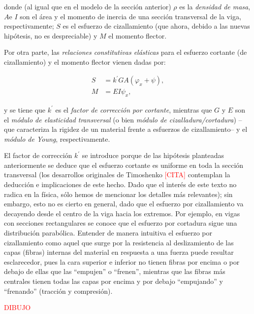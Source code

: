 donde (al igual que en el modelo de la sección anterior) $\rho$ es la \textit{densidad de masa}, $A$\footnotemark e $I$ son el área y el momento de inercia de una sección transversal de la viga, respectivamente; $S$ es el esfuerzo de cizallamiento (que ahora, debido a las nuevas hipótesis, no es despreciable) y $M$ el momento flector.  


Por otra parte, las \textit{relaciones constitutivas elásticas} para el esfuerzo cortante (de cizallamiento) y el momento flector vienen dadas por:

\begin{align}
    S &= k^{\prime}GA(\varphi_x + \psi), \label{timoshenkoBasico:relConstitutivasCortante}\\
    M &= EI \psi_x, \label{timoshenkoBasico:relConstitutivasFlector}
\end{align}

y se tiene que $k^{\prime}$ es el \textit{factor de corrección por cortante}, mientras que $G$ y $E$ son el \textit{módulo de elasticidad transversal} (o bien \textit{módulo de cizalladura/cortadura}) --que caracteriza la rigidez de un material frente a esfuerzos de cizallamiento-- y el \textit{módulo de Young}, respectivamente. 

El factor de corrección $k^{\prime}$ se introduce porque de las hipótesis planteadas anteriormente se deduce que el esfuerzo cortante es uniforme en toda la sección transversal (los desarrollos originales de Timoshenko \textcolor{red}{[CITA]} contemplan la deducción e implicaciones de este hecho. Dado que el interés de este texto no radica en la física, sólo hemos de mencionar los detalles más relevantes); sin embargo, esto no es cierto en general, dado que el esfuerzo por cizallamiento va decayendo desde el centro de la viga hacia los extremos. Por ejemplo, en vigas con secciones rectangulares se conoce que el esfuerzo por cortadura sigue una distribución parabólica. Entender de manera intuitiva el esfuerzo por cizallamiento como aquel que surge por la resistencia al deslizamiento de las capas (fibras) internas del material en respuesta a una fuerza puede resultar esclarecedor, pues la cara superior e inferior no tienen fibras por encima o por debajo de ellas que las ``empujen'' o ``frenen'', mientras que las fibras más centrales tienen todas las capas por encima y por debajo ``empujando'' y ``frenando'' (tracción y compresión).

\textcolor{red}{DIBUJO}

